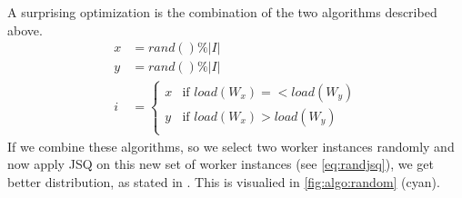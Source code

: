 A surprising optimization is the combination of the two algorithms described
above.
\begin{equation}
    \begin{aligned}
        x &= rand() \% |I| \\
        y &= rand() \% |I| \\
        i &= \begin{cases}
            x & \text{if } load(W_x) =< load(W_y)\\
            y & \text{if } load(W_x) > load(W_y)\\
        \end{cases}
    \end{aligned}
    \label{eq:randjsq}
\end{equation}
If we combine these algorithms, so we select two worker instances randomly and
now apply \ac{JSQ} on this new set of worker instances (see \ref{eq:randjsq}),
we get better distribution, as stated in \cite{powerOfTwoInRLB}.
This is visualied in \ref{fig:algo:random} (cyan).

